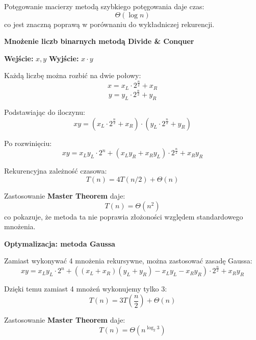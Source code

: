 \documentclass{article}
\begin{document}
Potęgowanie macierzy metodą szybkiego potęgowania daje czas:
\[
\Theta(\log n)
\]
co jest znaczną poprawą w porównaniu do wykładniczej rekurencji.

\textbf{Mnożenie liczb binarnych metodą Divide \& Conquer}

\textbf{Wejście:} $x, y$  
\textbf{Wyjście:} $x \cdot y$

Każdą liczbę można rozbić na dwie połowy:
\[
x = x_L \cdot 2^{\frac{n}{2}} + x_R
\]
\[
y = y_L \cdot 2^{\frac{n}{2}} + y_R
\]

Podstawiając do iloczynu:
\[
xy = (x_L \cdot 2^{\frac{n}{2}} + x_R) \cdot (y_L \cdot 2^{\frac{n}{2}} + y_R)
\]

Po rozwinięciu:
\[
xy = x_L y_L \cdot 2^n + (x_L y_R + x_R y_L) \cdot 2^{\frac{n}{2}} + x_R y_R
\]

Rekurencyjna zależność czasowa:
\[
T(n) = 4T(n/2) + \Theta(n)
\]

Zastosowanie \textbf{Master Theorem} daje:
\[
T(n) = \Theta(n^2)
\]
co pokazuje, że metoda ta nie poprawia złożoności względem standardowego mnożenia. 

\vspace{1\baselineskip}
\textbf{Optymalizacja: metoda Gaussa}

Zamiast wykonywać 4 mnożenia rekursywne, można zastosować zasadę Gaussa:
\[
xy = x_L y_L \cdot 2^n + ((x_L + x_R)(y_L + y_R) - x_L y_L - x_R y_R) \cdot 2^{\frac{n}{2}} + x_R y_R
\]

Dzięki temu zamiast 4 mnożeń wykonujemy tylko 3:
\[
T(n) = 3T(\frac{n}{2}) + \Theta(n)
\]

Zastosowanie \textbf{Master Theorem} daje:
\[
T(n) = \Theta(n^{\log_2 3})
\]
\end{document}
